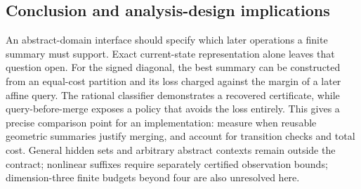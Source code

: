 \subsection{Conclusion and analysis-design implications}
An abstract-domain interface should specify which later operations a finite summary must support. Exact current-state representation alone leaves that question open. For the signed diagonal, the best summary can be constructed from an equal-cost partition and its loss charged against the margin of a later affine query. The rational classifier demonstrates a recovered certificate, while query-before-merge exposes a policy that avoids the loss entirely. This gives a precise comparison point for an implementation: measure when reusable geometric summaries justify merging, and account for transition checks and total cost. General hidden sets and arbitrary abstract contexts remain outside the contract; nonlinear suffixes require separately certified observation bounds; dimension-three finite budgets beyond four are also unresolved here.
